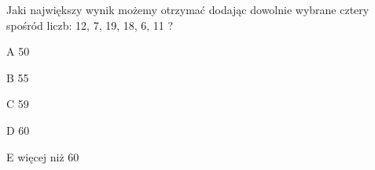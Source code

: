 \begin{tresc}
Jaki największy wynik możemy otrzymać dodając dowolnie wybrane cztery spośród liczb: 12, 7, 19, 18, 6, 11 ?
\end{tresc}
\begin{wariant}{A} 50 \end{wariant}
\begin{wariant}{B} 55 \end{wariant}
\begin{wariant}{C} 59 \end{wariant}
\begin{wariant}{D} 60 \end{wariant}
\begin{wariant}{E} więcej niż 60 \end{wariant}
